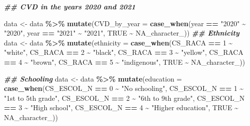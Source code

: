 \documentclass[
]{article}
\newenvironment{Shaded}{\begin{snugshade}}{\end{snugshade}}
\newcommand{\AttributeTok}[1]{\textcolor[rgb]{0.13,0.29,0.53}{#1}}
\newcommand{\ConstantTok}[1]{\textcolor[rgb]{0.56,0.35,0.01}{#1}}
\newcommand{\DecValTok}[1]{\textcolor[rgb]{0.00,0.00,0.81}{#1}}
\newcommand{\DocumentationTok}[1]{\textcolor[rgb]{0.56,0.35,0.01}{\textbf{\textit{#1}}}}
\newcommand{\FunctionTok}[1]{\textcolor[rgb]{0.13,0.29,0.53}{\textbf{#1}}}
\newcommand{\NormalTok}[1]{#1}
\newcommand{\OtherTok}[1]{\textcolor[rgb]{0.56,0.35,0.01}{#1}}
\newcommand{\SpecialCharTok}[1]{\textcolor[rgb]{0.81,0.36,0.00}{\textbf{#1}}}
\newcommand{\StringTok}[1]{\textcolor[rgb]{0.31,0.60,0.02}{#1}}
\begin{document}
\begin{Shaded}
\begin{Highlighting}[]
\DocumentationTok{\#\# CVD in the years 2020 and 2021}

\NormalTok{data }\OtherTok{\textless{}{-}}\NormalTok{ data }\SpecialCharTok{\%\textgreater{}\%} \FunctionTok{mutate}\NormalTok{(}\AttributeTok{CVD\_by\_year =} \FunctionTok{case\_when}\NormalTok{(year }\SpecialCharTok{==} \StringTok{"2020"} \SpecialCharTok{\textasciitilde{}} \StringTok{"2020"}\NormalTok{,}
\NormalTok{                                      year }\SpecialCharTok{==} \StringTok{"2021"} \SpecialCharTok{\textasciitilde{}} \StringTok{"2021"}\NormalTok{,}
                                      \ConstantTok{TRUE} \SpecialCharTok{\textasciitilde{}} \ConstantTok{NA\_character\_}\NormalTok{))}
\DocumentationTok{\#\# Ethnicity}
\NormalTok{data }\OtherTok{\textless{}{-}}\NormalTok{  data }\SpecialCharTok{\%\textgreater{}\%}
  \FunctionTok{mutate}\NormalTok{(}\AttributeTok{ethnicity =} \FunctionTok{case\_when}\NormalTok{(CS\_RACA }\SpecialCharTok{==} \DecValTok{1} \SpecialCharTok{\textasciitilde{}} \StringTok{"white"}\NormalTok{,}
\NormalTok{                             CS\_RACA }\SpecialCharTok{==} \DecValTok{2} \SpecialCharTok{\textasciitilde{}} \StringTok{"black"}\NormalTok{,}
\NormalTok{                             CS\_RACA }\SpecialCharTok{==} \DecValTok{3} \SpecialCharTok{\textasciitilde{}} \StringTok{"yellow"}\NormalTok{,}
\NormalTok{                             CS\_RACA }\SpecialCharTok{==} \DecValTok{4} \SpecialCharTok{\textasciitilde{}} \StringTok{"brown"}\NormalTok{,}
\NormalTok{                             CS\_RACA }\SpecialCharTok{==} \DecValTok{5} \SpecialCharTok{\textasciitilde{}} \StringTok{"indigenous"}\NormalTok{,}
                               \ConstantTok{TRUE} \SpecialCharTok{\textasciitilde{}} \ConstantTok{NA\_character\_}\NormalTok{))}

\DocumentationTok{\#\# Schooling      }
\NormalTok{data }\OtherTok{\textless{}{-}}\NormalTok{ data }\SpecialCharTok{\%\textgreater{}\%}
     \FunctionTok{mutate}\NormalTok{(}\AttributeTok{education =} \FunctionTok{case\_when}\NormalTok{(CS\_ESCOL\_N }\SpecialCharTok{==} \DecValTok{0} \SpecialCharTok{\textasciitilde{}} \StringTok{"No schooling"}\NormalTok{,}
\NormalTok{                        CS\_ESCOL\_N }\SpecialCharTok{==} \DecValTok{1} \SpecialCharTok{\textasciitilde{}} \StringTok{"1st to 5th grade"}\NormalTok{,}
\NormalTok{                        CS\_ESCOL\_N }\SpecialCharTok{==} \DecValTok{2} \SpecialCharTok{\textasciitilde{}} \StringTok{"6th to 9th grade"}\NormalTok{,}
\NormalTok{                        CS\_ESCOL\_N }\SpecialCharTok{==} \DecValTok{3} \SpecialCharTok{\textasciitilde{}} \StringTok{"High school"}\NormalTok{,}
\NormalTok{                        CS\_ESCOL\_N }\SpecialCharTok{==} \DecValTok{4} \SpecialCharTok{\textasciitilde{}} \StringTok{"Higher education"}\NormalTok{,}
                          \ConstantTok{TRUE} \SpecialCharTok{\textasciitilde{}} \ConstantTok{NA\_character\_}\NormalTok{))}


\end{Highlighting}
\end{Shaded}
\end{document}
